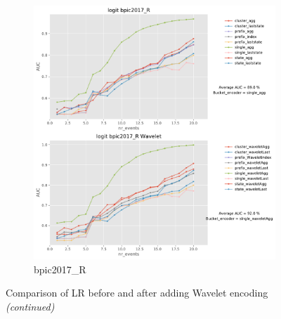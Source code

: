 \documentclass[twoside,11pt]{Latex/Classes/PhDthesisPSnPDF}
\begin{document}
\begin{figure}[!htbp]
	\medskip
	\begin{subfigure}{0.48\textwidth}
		\includegraphics[width=\linewidth]{images/wavelet/graphs2logit/bpic2017_R.pdf}	
		\caption{bpic2017\_R} 
	\end{subfigure}\hspace*{\fill}
	\caption{Comparison of LR before and after adding Wavelet encoding \textit{(continued)}}
	\label{fig:wl3}
\end{figure}


\end{document}
